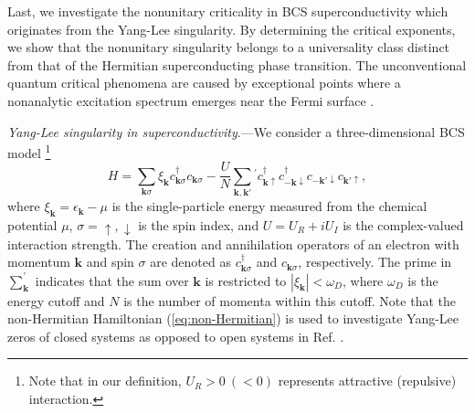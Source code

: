 \documentclass[aps,prl,twocolumn,superscriptaddress]{revtex4-1}
\begin{document}
\begin{bibunit}[apsrev4-2]
Last, we investigate the nonunitary criticality in BCS superconductivity which originates from the Yang-Lee singularity. By determining the critical exponents, we show that the nonunitary singularity belongs to a universality
class distinct from that of the Hermitian superconducting phase transition. The unconventional quantum critical phenomena are caused by exceptional points where a nonanalytic excitation spectrum emerges near the Fermi surface \cite{Yamamoto2019}.

\emph{Yang-Lee singularity in superconductivity}.---We consider a three-dimensional
BCS model \cite{Yamamoto2019}\footnote{Note that in our definition, $U_{R}>0\:(<0)$ represents attractive
(repulsive) interaction.} 
\begin{equation}
H=\sum_{\boldsymbol{k}\sigma}\xi_{\boldsymbol{k}}c_{\boldsymbol{k}\sigma}^{\dagger}c_{\boldsymbol{k}\sigma}-\frac{U}{N}\sum_{\bm{k},\bm{k}'}{}^{'}c_{\bm{k}\uparrow}^{\dagger}c_{\bm{-k}\downarrow}^{\dagger}c_{\bm{-k}'\downarrow}c_{\bm{k}'\uparrow},\label{eq:non-Hermitian}
\end{equation}
where $\xi_{\boldsymbol{k}}=\epsilon_{\bm{k}}-\mu$ is the single-particle
energy measured from the chemical potential $\mu$, $\sigma=\uparrow,\downarrow$
is the spin index, and $U=U_{R}+iU_{I}$ is the complex-valued
interaction strength. %
The creation and annihilation operators of an electron with momentum $\bm{k}$ and spin $\sigma$ are denoted as $c_{\bm{k}\sigma}^{\dagger}$
and $c_{\bm{k}\sigma}$, respectively. The prime in $\sum_{\bm{k}}^{'}$
indicates that the sum over $\bm{k}$ is restricted to $|\xi_{\boldsymbol{k}}|<\omega_{D}$,
where $\omega_{D}$ is the energy cutoff and $N$ is the number of momenta within this cutoff. Note that the non-Hermitian Hamiltonian (\ref{eq:non-Hermitian}) is used to investigate Yang-Lee zeros of closed systems as opposed to open systems in Ref. \cite{Yamamoto2019}. 


\end{bibunit}
\end{document}
